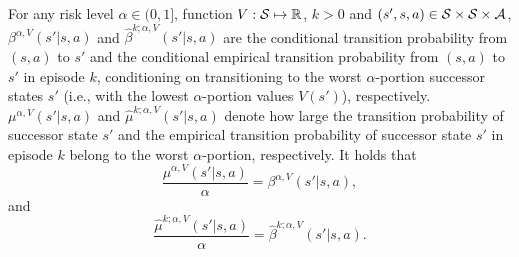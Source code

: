 For any risk level $\alpha \in (0,1]$, function $V: \mathcal{S} \mapsto \mathbb{R}$, $k>0$ and $(s',s,a) \in \mathcal{S} \times \mathcal{S} \times \mathcal{A}$, $\beta^{\alpha,V}(s'|s,a)$ and $\hat{\beta}^{k;\alpha,V}(s'|s,a)$ are the conditional transition probability from $(s,a)$ to $s'$ and the conditional empirical transition probability from $(s,a)$ to $s'$ in episode $k$, conditioning on transitioning to the worst $\alpha$-portion successor states $s'$ (i.e., with the lowest $\alpha$-portion values $V(s')$), respectively.
$\mu^{\alpha,V}(s'|s,a)$ and $\hat{\mu}^{k;\alpha,V}(s'|s,a)$ denote how large the transition probability of successor state $s'$ and the empirical transition probability of successor state $s'$ in episode $k$ belong to the worst $\alpha$-portion, respectively. 
It holds that  
$$
\frac{\mu^{\alpha,V}(s'|s,a)}{\alpha} = \beta^{\alpha,V}(s'|s,a) ,
$$ 
and 
$$
\frac{\hat{\mu}^{k;\alpha,V}(s'|s,a)}{\alpha} = \hat{\beta}^{k;\alpha,V}(s'|s,a) .
$$

